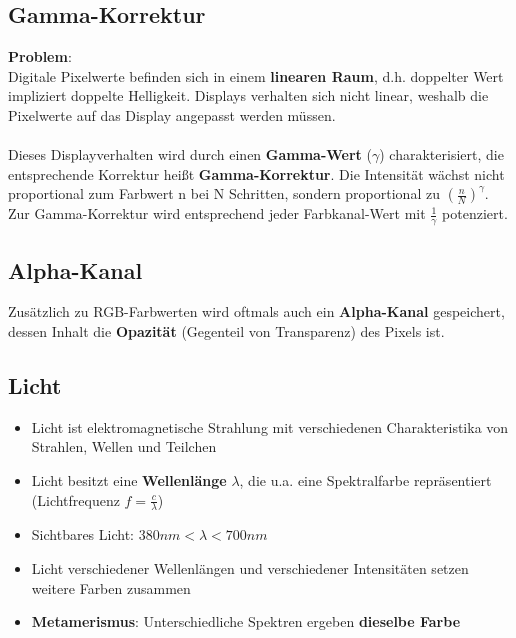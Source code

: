 \documentclass[10pt,a4paper]{article}
\begin{document}
	\subsection{Gamma-Korrektur}
	\label{sub:gamma_korrektur}

	\textbf{Problem}:\\
	Digitale Pixelwerte befinden sich in einem \textbf{linearen Raum}, d.h. doppelter Wert impliziert doppelte Helligkeit. Displays verhalten sich nicht linear, weshalb die Pixelwerte auf das Display angepasst werden müssen.
	\\\\
	Dieses Displayverhalten wird durch einen \textbf{Gamma-Wert} ($\gamma$) charakterisiert, die entsprechende Korrektur heißt \textbf{Gamma-Korrektur}. Die Intensität wächst nicht proportional zum Farbwert n bei N Schritten, sondern proportional zu $(\frac{n}{N})^{\gamma}$. Zur Gamma-Korrektur wird entsprechend jeder Farbkanal-Wert mit $\frac{1}{\gamma}$ potenziert.

	\subsection{Alpha-Kanal}
	\label{sub:alpha_kanal}
	
	Zusätzlich zu RGB-Farbwerten wird oftmals auch ein \textbf{Alpha-Kanal} gespeichert, dessen Inhalt die \textbf{Opazität} (Gegenteil von Transparenz) des Pixels ist.

	\subsection{Licht}
	\label{sub:licht}

	\begin{itemize}
		\item Licht ist elektromagnetische Strahlung mit verschiedenen Charakteristika von Strahlen, Wellen und Teilchen
		\item Licht besitzt eine \textbf{Wellenlänge} $\lambda$, die u.a. eine Spektralfarbe repräsentiert\\(Lichtfrequenz $f = \frac{c}{\lambda}$)
		\item Sichtbares Licht: $380nm < \lambda < 700nm$
		\item Licht verschiedener Wellenlängen und verschiedener Intensitäten setzen weitere Farben zusammen
		\item \textbf{Metamerismus}: Unterschiedliche Spektren ergeben \textbf{dieselbe Farbe}
	\end{itemize}
\end{document}
